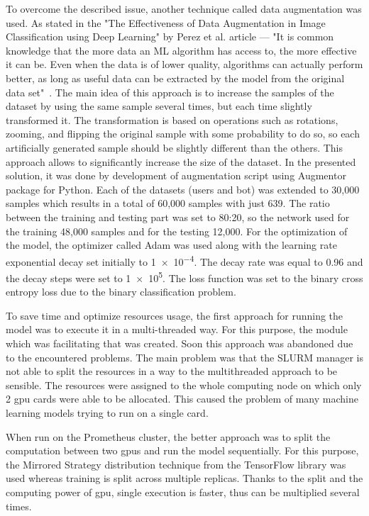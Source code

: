 To overcome the described issue, another technique called data augmentation was used.
As stated in the "The Effectiveness of Data Augmentation in Image Classification using Deep Learning" by Perez et al. article --- "It is common knowledge that the more data an ML algorithm has access to, the more effective it can be.
Even when the data is of lower quality, algorithms can actually perform better, as long as useful data can be extracted by the model from the original data set"~\cite{augmentation}.
The main idea of this approach is to increase the samples of the dataset by using the same sample several times, but each time slightly transformed it.
The transformation is based on operations such as rotations, zooming, and flipping the original sample with some probability to do so, so each artificially generated sample should be slightly different than the others.
This approach allows to significantly increase the size of the dataset.
In the presented solution, it was done by development of augmentation script using Augmentor package for Python.
Each of the datasets (users and bot) was extended to 30,000 samples which results in a total of 60,000 samples with just 639.
The ratio between the training and testing part was set to 80:20, so the network used for the training 48,000 samples and for the testing 12,000.
For the optimization of the model, the optimizer called Adam was used along with the learning rate exponential decay set initially to \num{1e-4}.
The decay rate was equal to 0.96 and the decay steps were set to \num{1e5}.
The loss function was set to the binary cross entropy loss due to the binary classification problem.

To save time and optimize resources usage, the first approach for running the model was to execute it in a multi-threaded way.
For this purpose, the module which was facilitating that was created.
Soon this approach was abandoned due to the encountered problems.
The main problem was that the SLURM manager is not able to split the resources in a way to the multithreaded approach to be sensible.
The resources were assigned to the whole computing node on which only 2 \gls{gpu} cards were able to be allocated.
This caused the problem of many machine learning models trying to run on a single card.

When run on the Prometheus cluster, the better approach was to split the computation between two \gls{gpu}s and run the model sequentially.
For this purpose, the Mirrored Strategy distribution technique from the TensorFlow library was used whereas training is split across multiple replicas.
Thanks to the split and the computing power of \gls{gpu}, single execution is faster, thus can be multiplied several times.